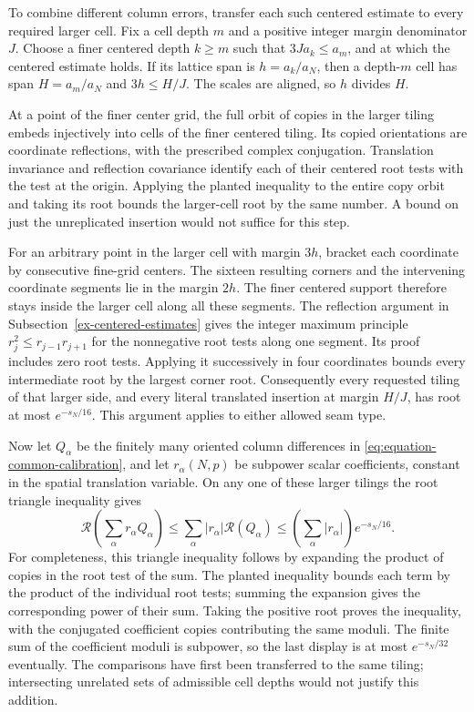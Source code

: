 To combine different column errors, transfer each such centered estimate
to every required larger cell. Fix a cell depth $m$ and a positive integer
margin denominator $J$. Choose a finer centered depth $k\ge m$ such that
$3J a_k\le a_m$, and at which the centered estimate holds. If its lattice
span is $h=a_k/a_N$, then a depth-$m$ cell has span $H=a_m/a_N$ and
$3h\le H/J$. The scales are aligned, so $h$ divides $H$.

At a point of the finer center grid, the full orbit of copies in the
larger tiling embeds injectively into cells of the finer centered tiling.
Its copied orientations are coordinate reflections, with the prescribed
complex conjugation. Translation invariance and reflection covariance
identify each of their centered root tests with the test at the origin.
Applying the planted inequality to the entire copy orbit and taking its
root bounds the larger-cell root by the same number. A bound on just
the unreplicated insertion would not suffice for this step.

For an arbitrary point in the larger cell with margin $3h$, bracket each
coordinate by consecutive fine-grid centers. The sixteen resulting
corners and the intervening coordinate segments lie in the margin $2h$.
The finer centered support therefore stays inside the larger cell along
all these segments. The reflection argument in
Subsection~\ref{ex-centered-estimates} gives the integer maximum principle
$r_j^2\le r_{j-1}r_{j+1}$ for the nonnegative root tests along one segment.
Its proof includes zero root tests. Applying it successively in four
coordinates bounds every intermediate root by the largest corner root.
Consequently every requested tiling of that larger side, and every
literal translated insertion at margin $H/J$, has root at most
$e^{-s_N/16}$. This argument applies to either allowed seam type.

Now let $Q_\alpha$ be the finitely many oriented column differences in
\eqref{eq:equation-common-calibration}, and let $r_\alpha(N,p)$ be
subpower scalar coefficients, constant in the spatial translation
variable. On any one of these larger tilings the root triangle inequality
gives
\[
 \mathcal R\left(\sum_\alpha r_\alpha Q_\alpha\right)
        \le\sum_\alpha|r_\alpha|\mathcal R(Q_\alpha)
        \le\left(\sum_\alpha|r_\alpha|\right)e^{-s_N/16}.
\]
For completeness, this triangle inequality follows by expanding the
product of copies in the root test of the sum. The planted inequality
bounds each term by the product of the individual root tests; summing
the expansion gives the corresponding power of their sum. Taking the
positive root proves the inequality, with the conjugated coefficient
copies contributing the same moduli. The finite sum of the coefficient
moduli is subpower, so the last display is at most $e^{-s_N/32}$
eventually. The comparisons have first been transferred to the same
tiling; intersecting unrelated sets of admissible cell depths would not
justify this addition.

